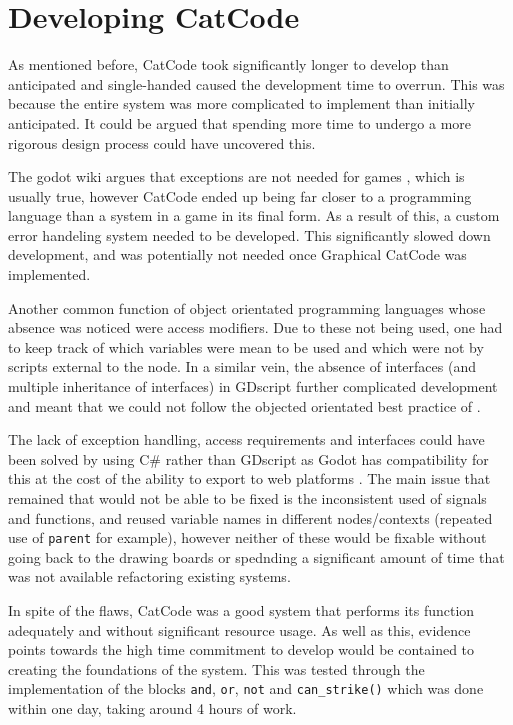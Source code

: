 \section{Developing CatCode}\label{sec:devRep/catCode}

As mentioned before, CatCode took significantly longer to develop than anticipated and single-handed caused the development time to overrun. This was because the entire system was more complicated to implement than initially anticipated. It could be argued that spending more time to undergo a more rigorous design process could have uncovered this.

The godot wiki argues that exceptions are not needed for games \citep{GodotExceptions}, which is usually true, however CatCode ended up being far closer to a programming language than a system in a game in its final form. As a result of this, a custom error handeling system needed to be developed. This significantly slowed down development, and was potentially not needed once Graphical CatCode was implemented.

Another common function of object orientated programming languages whose absence was noticed were access modifiers. Due to these not being used, one had to keep track of which variables were mean to be used and which were not by scripts external to the node. In a similar vein, the absence of interfaces (and multiple inheritance of interfaces) in GDscript further complicated development and meant that we could not follow the objected orientated best practice of  \citep{oop-ptinti}.

The lack of exception handling, access requirements and interfaces could have been solved by using C\# rather than GDscript as Godot has compatibility for this at the cost of the ability to export to web platforms \citep{GodotCSharp}. The main issue that remained that would not be able to be fixed is the inconsistent used of signals and functions, and reused variable names in different nodes/contexts (repeated use of \texttt{parent} for example), however neither of these would be fixable without going back to the drawing boards or spednding a significant amount of time that was not available refactoring existing systems.

In spite of the flaws, CatCode was a good system that performs its function adequately and without significant resource usage. As well as this, evidence points towards the high time commitment to develop would be contained to creating the foundations of the system. This was tested through the implementation of the blocks \texttt{and}, \texttt{or}, \texttt{not} and \texttt{can\_strike()} which was done within one day, taking around 4 hours of work.

